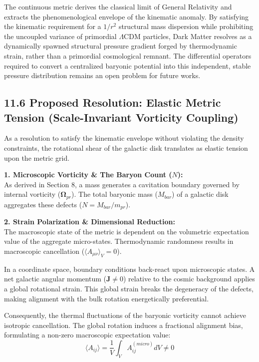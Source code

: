 The continuous metric derives the classical limit of General Relativity and extracts the phenomenological envelope of the kinematic anomaly. By satisfying the kinematic requirement for a $1/r^2$ structural mass dispersion while prohibiting the uncoupled variance of primordial $\Lambda$CDM particles, Dark Matter resolves as a dynamically spawned structural pressure gradient forged by thermodynamic strain, rather than a primordial cosmological remnant. The differential operators required to convert a centralized baryonic potential into this independent, stable pressure distribution remains an open problem for future works. 
\subsection*{11.6 Proposed Resolution: Elastic Metric Tension (Scale-Invariant Vorticity Coupling)} 
\label{sec:deriv_admittance_depletion}

As a resolution to satisfy the kinematic envelope without violating the density constraints, the rotational shear of the galactic disk translates as elastic tension upon the metric grid. 

\textbf{1. Microscopic Vorticity \& The Baryon Count ($N$):} \\
As derived in Section 8, a mass generates a cavitation boundary governed by internal vorticity ($\boldsymbol{\Omega}_{pr}$). The total baryonic mass ($M_{bar}$) of a galactic disk aggregates these defects ($N = M_{bar} / m_{pr}$).


\textbf{2. Strain Polarization \& Dimensional Reduction:} \\ 
The macroscopic state of the metric is dependent on the volumetric expectation value of the aggregate micro-states. Thermodynamic randomness results in macroscopic cancellation ($\langle A_{\mu\nu} \rangle_V = 0$). 

In a coordinate space, boundary conditions back-react upon microscopic states. A net galactic angular momentum ($\mathbf{J} \neq 0$) relative to the cosmic background applies a global rotational strain. This global strain breaks the degeneracy of the defects, making alignment with the bulk rotation energetically preferential. 

Consequently, the thermal fluctuations of the baryonic vorticity cannot achieve isotropic cancellation. The global rotation induces a fractional alignment bias, formulating a non-zero macroscopic expectation value: 
\begin{equation}
    \langle A_{ij} \rangle = \frac{1}{V} \int_V A_{ij}^{(micro)} dV \neq 0
\end{equation}

